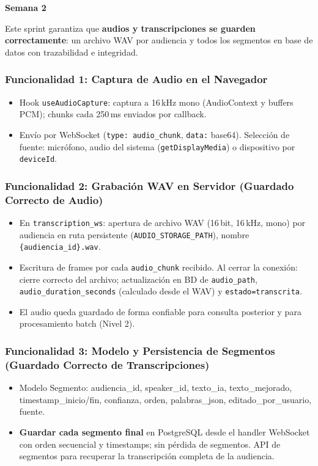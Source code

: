 \documentclass[12pt,a4paper]{report}
\begin{document}
\textbf{Semana 2}

Este sprint garantiza que \textbf{audios y transcripciones se guarden correctamente}: un archivo WAV por audiencia y todos los segmentos en base de datos con trazabilidad e integridad.

\subsubsection{Funcionalidad 1: Captura de Audio en el Navegador}

\begin{itemize}
    \item Hook \texttt{useAudioCapture}: captura a 16\,kHz mono (AudioContext y buffers PCM); chunks cada 250\,ms enviados por callback.
    \item Envío por WebSocket (\texttt{type: audio\_chunk}, \texttt{data:} base64). Selección de fuente: micrófono, audio del sistema (\texttt{getDisplayMedia}) o dispositivo por \texttt{deviceId}.
\end{itemize}

\subsubsection{Funcionalidad 2: Grabación WAV en Servidor (Guardado Correcto de Audio)}

\begin{itemize}
    \item En \texttt{transcription\_ws}: apertura de archivo WAV (16\,bit, 16\,kHz, mono) por audiencia en ruta persistente (\texttt{AUDIO\_STORAGE\_PATH}), nombre \texttt{\{audiencia\_id\}.wav}.
    \item Escritura de frames por cada \texttt{audio\_chunk} recibido. Al cerrar la conexión: cierre correcto del archivo; actualización en BD de \texttt{audio\_path}, \texttt{audio\_duration\_seconds} (calculado desde el WAV) y \texttt{estado=transcrita}.
    \item El audio queda guardado de forma confiable para consulta posterior y para procesamiento batch (Nivel 2).
\end{itemize}

\subsubsection{Funcionalidad 3: Modelo y Persistencia de Segmentos (Guardado Correcto de Transcripciones)}

\begin{itemize}
    \item Modelo Segmento: audiencia\_id, speaker\_id, texto\_ia, texto\_mejorado, timestamp\_inicio/fin, confianza, orden, palabras\_json, editado\_por\_usuario, fuente.
    \item \textbf{Guardar cada segmento final} en PostgreSQL desde el handler WebSocket con orden secuencial y timestamps; sin pérdida de segmentos. API de segmentos para recuperar la transcripción completa de la audiencia.
\end{itemize}
\end{document}
